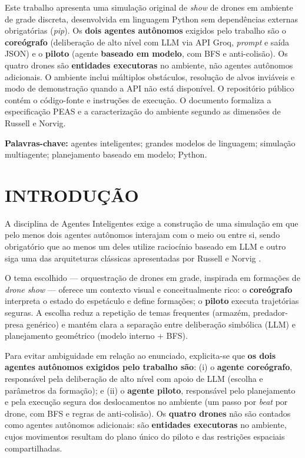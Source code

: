 \documentclass[12pt,a4paper,oneside]{article}
\begin{document}
Este trabalho apresenta uma simulação original de \textit{show} de drones em ambiente de grade discreta, desenvolvida em linguagem Python sem dependências externas obrigatórias (\textit{pip}). Os \textbf{dois agentes autônomos} exigidos pelo trabalho são o \textbf{coreógrafo} (deliberação de alto nível com LLM via API Groq, \textit{prompt} e saída JSON) e o \textbf{piloto} (agente \textbf{baseado em modelo}, com BFS e anti-colisão). Os quatro drones são \textbf{entidades executoras} no ambiente, não agentes autônomos adicionais. O ambiente inclui múltiplos obstáculos, resolução de alvos inviáveis e modo de demonstração quando a API não está disponível. O repositório público contém o código-fonte e instruções de execução. O documento formaliza a especificação PEAS e a caracterização do ambiente segundo as dimensões de Russell e Norvig.

\vspace{0.5cm}
\noindent\textbf{Palavras-chave:} agentes inteligentes; grandes modelos de linguagem; simulação multiagente; planejamento baseado em modelo; Python.

\newpage
\tableofcontents
\newpage

\section{INTRODUÇÃO}

A disciplina de Agentes Inteligentes exige a construção de uma simulação em que pelo menos dois agentes autônomos interajam com o meio ou entre si, sendo obrigatório que ao menos um deles utilize raciocínio baseado em LLM e outro siga uma das arquiteturas clássicas apresentadas por Russell e Norvig \cite{russell2021}.

O tema escolhido --- orquestração de drones em grade, inspirada em formações de \textit{drone show} --- oferece um contexto visual e conceitualmente rico: o \textbf{coreógrafo} interpreta o estado do espetáculo e define formações; o \textbf{piloto} executa trajetórias seguras. A escolha reduz a repetição de temas frequentes (armazém, predador-presa genérico) e mantém clara a separação entre deliberação simbólica (LLM) e planejamento geométrico (modelo interno + BFS).

Para evitar ambiguidade em relação ao enunciado, explicita-se que \textbf{os dois agentes autônomos exigidos pelo trabalho são}: (i) o \textbf{agente coreógrafo}, responsável pela deliberação de alto nível com apoio de LLM (escolha e parâmetros da formação); e (ii) o \textbf{agente piloto}, responsável pelo planejamento e pela execução segura dos deslocamentos no ambiente (um passo por \textit{beat} por drone, com BFS e regras de anti-colisão). Os \textbf{quatro drones} não são contados como agentes autônomos adicionais: são \textbf{entidades executoras} no ambiente, cujos movimentos resultam do plano único do piloto e das restrições espaciais compartilhadas.
\end{document}
